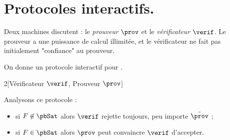 \documentclass[./main]{subfiles}
\begin{document}
  \chapter{Protocoles interactifs.}

  Deux machines discutent : le \textit{prouveur} $\prov$ et le \textit{vérificateur} $\verif$.
  Le prouveur a une puissance de calcul illimitée, et le vérificateur ne fait pas initialement "confiance" au prouveur.

  \begin{exm}
    On donne un protocole interactif pour \pbSat.

    \begin{algorithm}[H]
      \caption{Protocole interactif pour \pbSat}
      \begin{paralgo}{2}[Vérificateur $\verif$, Prouveur $\prov$]
        \Else[0]
        \EndIf[0]
      \end{paralgo}
    \end{algorithm}

    Analysons ce protocole :
    \begin{itemize}
      \item si $F \not\in \pbSat$ alors $\verif$ rejette toujours, peu importe $\tilde{\prov}$ ;
      \item si $F \in \pbSat$ alors $\prov$ peut convaincre $\verif$ d'accepter.
    \end{itemize}
  \end{exm}
\end{document}
